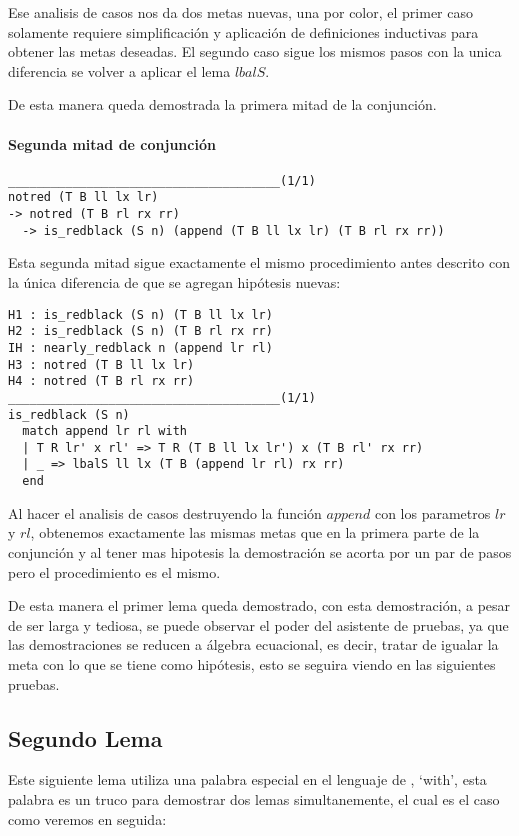 Ese analisis de casos nos da dos metas nuevas, una por color, el primer caso solamente requiere
simplificaci\'on y aplicaci\'on de definiciones inductivas para obtener las metas deseadas. El
segundo caso sigue los mismos pasos con la unica diferencia se volver a aplicar el lema $lbalS$.

De esta manera queda demostrada la primera mitad de la conjunci\'on.

\paragraph{Segunda mitad de conjunci\'on}

\begin{verbatim}
______________________________________(1/1)
notred (T B ll lx lr)
-> notred (T B rl rx rr)
  -> is_redblack (S n) (append (T B ll lx lr) (T B rl rx rr))
\end{verbatim}

Esta segunda mitad sigue exactamente el mismo procedimiento antes descrito con la \'unica
diferencia de que se agregan hip\'otesis nuevas:

\begin{verbatim}
H1 : is_redblack (S n) (T B ll lx lr)
H2 : is_redblack (S n) (T B rl rx rr)
IH : nearly_redblack n (append lr rl)
H3 : notred (T B ll lx lr)
H4 : notred (T B rl rx rr)
______________________________________(1/1)
is_redblack (S n)
  match append lr rl with
  | T R lr' x rl' => T R (T B ll lx lr') x (T B rl' rx rr)
  | _ => lbalS ll lx (T B (append lr rl) rx rr)
  end
\end{verbatim}

Al hacer el analisis de casos destruyendo la funci\'on $append$ con los parametros $lr$ y $rl$,
obtenemos exactamente las mismas metas que en la primera parte de la conjunci\'on y al tener mas
hipotesis la demostraci\'on se acorta por un par de pasos pero el procedimiento es el mismo.

De esta manera el primer lema queda demostrado, con esta demostraci\'on, a pesar de ser larga y
tediosa, se puede observar el poder del asistente de pruebas, ya que las demostraciones se reducen
a álgebra ecuacional, es decir, tratar de igualar la meta con lo que se tiene como hip\'otesis,
esto se seguira viendo en las siguientes pruebas.

\subsection{Segundo Lema}
Este siguiente lema utiliza una palabra especial en el lenguaje de {\coq}, `with', esta palabra
es un truco para demostrar dos lemas simultanemente, el cual es el caso como veremos en seguida:

